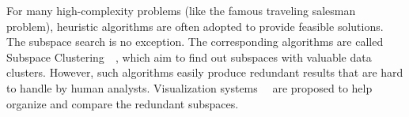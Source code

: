 For many high-complexity problems (like the famous traveling salesman problem), heuristic algorithms are often adopted to provide feasible solutions. The subspace search is no exception. The corresponding algorithms are called Subspace Clustering~\cite{DBLP:journals/sigkdd/ParsonsHL04}~\cite{DBLP:journals/spm/Vidal11}, which aim to find out subspaces with valuable data clusters. However, such algorithms easily produce redundant results that are hard to handle by human analysts. Visualization systems~\cite{DBLP:conf/ieeevast/TatuMFBSSK12}~\cite{jackle2017pattern} are proposed to help organize and compare the redundant subspaces.

